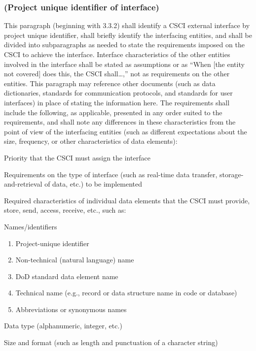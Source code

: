 \documentclass{fidata-report-template}
\begin{document}
\subsubsection{(Project unique identifier of interface)}

This paragraph (beginning with 3.3.2) shall identify a CSCI external
interface by project unique identifier, shall briefly identify the
interfacing entities, and shall be divided into subparagraphs as needed
to state the requirements imposed on the CSCI to achieve the interface.
Interface characteristics of the other entities involved in the
interface shall be stated as assumptions or as ``When {[}the entity not
covered{]} does this, the CSCI shall\ldots{},'' not as requirements on
the other entities. This paragraph may reference other documents (such
as data dictionaries, standards for communication protocols, and
standards for user interfaces) in place of stating the information here.
The requirements shall include the following, as applicable, presented
in any order suited to the requirements, and shall note any differences
in these characteristics from the point of view of the interfacing
entities (such as different expectations about the size, frequency, or
other characteristics of data elements):

Priority that the CSCI must assign the interface

Requirements on the type of interface (such as real-time data transfer,
storage-and-retrieval of data, etc.) to be implemented

Required characteristics of individual data elements that the CSCI must
provide, store, send, access, receive, etc., such as:

Names/identifiers

\begin{enumerate}
\itemsep1pt\parskip0pt
\item
  Project-unique identifier
\item
  Non-technical (natural language) name
\item
  DoD standard data element name
\item
  Technical name (e.g., record or data structure name in code or
  database)
\item
  Abbreviations or synonymous names
\end{enumerate}

Data type (alphanumeric, integer, etc.)

Size and format (such as length and punctuation of a character string)
\end{document}

